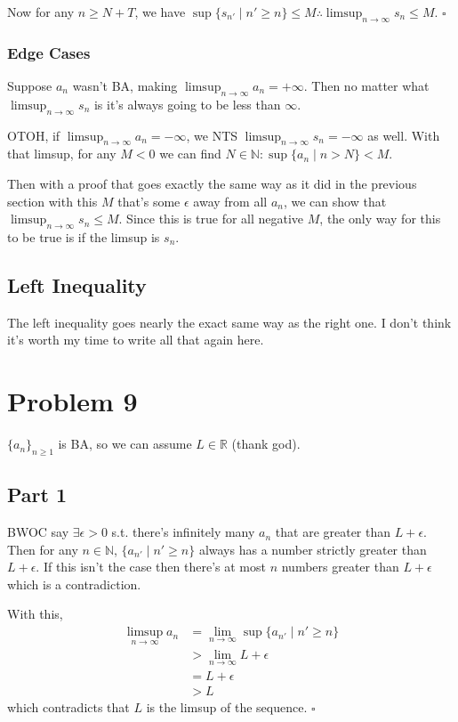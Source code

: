 \documentclass[12pt]{article}
\newcommand{\N}{\mathbb{N}}
\newcommand{\R}{\mathbb{R}}
\begin{document}
Now for any $n \ge N+T$, we have
$\sup \{s_{n'} \mid n' \ge n\} \le M \therefore \limsup_{n \to \infty} s_n \le M$. $\square$

\subsubsection{Edge Cases}

Suppose $a_n$ wasn't BA, making $\limsup_{n \to \infty} a_n = +\infty$.
Then no matter what $\limsup_{n \to \infty} s_n$ is it's always going to be less than $\infty$.

OTOH, if $\limsup_{n \to \infty} a_n = -\infty$, we NTS $\limsup_{n \to \infty} s_n = -\infty$ as well.
With that limsup, for any $M < 0$ we can find $N \in \N: \sup \{a_n \mid n > N\} < M$.

Then with a proof that goes exactly the same way as it did in the previous section
with this $M$ that's some $\epsilon$ away from all $a_n$,
we can show that $\limsup_{n \to \infty} s_n \le M$.
Since this is true for all negative $M$, the only way for this to be true is if the limsup is $s_n$.

\subsection{Left Inequality}

The left inequality goes nearly the exact same way as the right one.
I don't think it's worth my time to write all that again here.

\pagebreak

\section{Problem 9}

$\{a_n\}_{n \ge 1}$ is BA, so we can assume $L \in \R$ (thank god).

\subsection{Part 1}\label{sec:prob9p1}

BWOC say $\exists \epsilon > 0$ s.t. there's infinitely many $a_n$ that are greater than $L+\epsilon$.
Then for any $n \in \N$, $\{a_{n'} \mid n' \ge n\}$ always has a number strictly greater than $L+\epsilon$.
If this isn't the case then there's at most $n$ numbers greater than $L+\epsilon$ which is a contradiction.

With this,
\begin{align*}
  \limsup_{n \to \infty} a_n
   & = \lim_{n \to \infty} \sup \{a_{n'} \mid n' \ge n\} \\
   & > \lim_{n \to \infty} L+\epsilon                    \\
   & = L+\epsilon                                        \\
   & > L
\end{align*}
which contradicts that $L$ is the limsup of the sequence. $\square$
\end{document}
